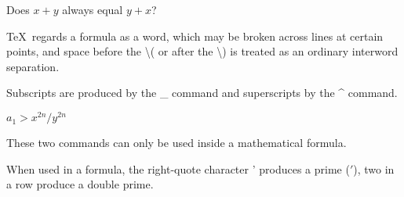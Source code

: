 \documentclass[twocolumn]{article}        %
\begin{document}
Does \( x + y \) always equal \(y+x\)?

\TeX\ regards a formula as a word, which may be broken across lines at certain points, 
and space before the \textbackslash (  or after the \textbackslash ) is treated as an 
ordinary interword separation.

Subscripts are produced by the \_ command and superscripts by the \^{} command.

\( a_{1} > x^{2n} / y^{2n} \)

These two commands can only be used inside a mathematical formula.

When used in a formula, the right-quote character ' produces a prime (\('\)),
two in a row produce a double prime.
\end{document}
